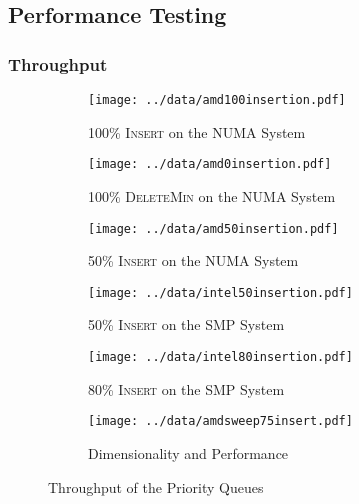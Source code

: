 \documentclass{beamer}
\begin{document}
\subsection{Performance Testing}
\begin{frame} \frametitle{Throughput}
\begin{figure}[t]
    \begin{subfigure}{0.3\textwidth}
        \centering
        \texttt{[image: ../data/amd100insertion.pdf]}
        \caption{100\% \textsc{Insert} on the NUMA System}
        \label{fig:100ins}
    \end{subfigure}
    \hfill
    \begin{subfigure}{0.3\textwidth}
        \centering
        \texttt{[image: ../data/amd0insertion.pdf]}
        \caption{100\% \textsc{DeleteMin} on the NUMA System}
        \label{fig:0ins}
    \end{subfigure}
    \hfill
    \begin{subfigure}{0.3\textwidth}
        \centering
        \texttt{[image: ../data/amd50insertion.pdf]}
        \caption{50\% \textsc{Insert} on the NUMA System}
        \label{fig:50ins}
    \end{subfigure}
    \begin{subfigure}{0.3\textwidth}
        \centering
        \texttt{[image: ../data/intel50insertion.pdf]}
        \caption{50\% \textsc{Insert} on the SMP System}
        \label{fig:50insintel}
    \end{subfigure}
    \hfill
    \begin{subfigure}{0.3\textwidth}
        \centering
        \texttt{[image: ../data/intel80insertion.pdf]}
        \caption{80\% \textsc{Insert} on the SMP System}
        \label{fig:80ins}
    \end{subfigure}
    \hfill
    \begin{subfigure}{0.3\textwidth}
        \centering
        \texttt{[image: ../data/amdsweep75insert.pdf]}
        \caption{Dimensionality and Performance}
        \label{fig:sweep}
    \end{subfigure}
    \caption{Throughput of the Priority Queues}
    \label{fig:throughput}
\end{figure}
\end{frame}
\end{document}

